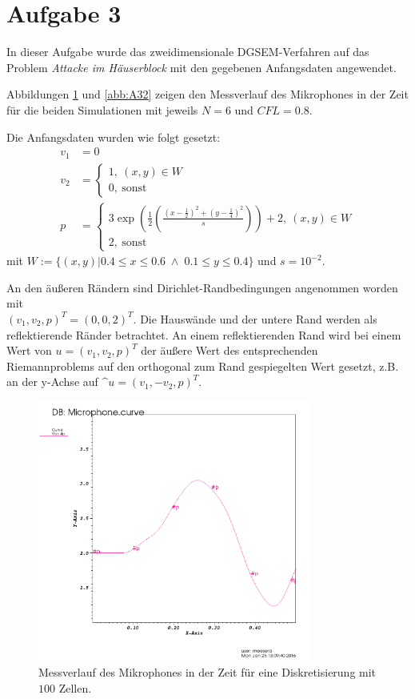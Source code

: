\section*{Aufgabe 3}
\label{sec:3}

In dieser Aufgabe wurde das zweidimensionale DGSEM-Verfahren auf das Problem
\textit{Attacke im Häuserblock} mit den gegebenen Anfangsdaten angewendet.

Abbildungen \ref{abb:A31} und \ref{abb:A32} zeigen den Messverlauf des
Mikrophones in der Zeit für die beiden Simulationen mit jeweils $N=6$ und
$CFL=0.8$.

Die Anfangsdaten wurden wie folgt gesetzt:
\begin{align}
v_1 &= 0\\
v_2 &= \begin{cases}
1, \ (x,y)\in W\\
0, \ \text{sonst}
\end{cases}\\
p &= \begin{cases}
3\exp (\frac{1}{2}(\frac{(x-\frac{1}{2})^2+(y-\frac{1}{4})^2}{s}))+2, \ (x,y)\in W\\
2, \ \text{sonst}
\end{cases}
\end{align}
mit $W:=\{(x,y) | 0.4\leq x\leq 0.6 \; \wedge \; 0.1\leq y\leq 0.4\}$ und $s=10^{-2}$.

An den äußeren Rändern sind Dirichlet-Randbedingungen angenommen worden mit \\
$(v_1,v_2,p)^T = (0,0,2)^T$. Die Hauswände und der untere Rand werden als
reflektierende Ränder betrachtet. An einem reflektierenden Rand wird bei einem
Wert von $u=(v_1,v_2,p)^T$ der äußere Wert des entsprechenden Riemannproblems
auf den orthogonal zum Rand gespiegelten Wert gesetzt, z.B. an der y-Achse auf
$\^{u}=(v_1,-v_2,p)^T$.

\begin{figure}[H]
	\begin{center}
		\includegraphics[width=0.8\textwidth]{img/Microphone_lowRes.png}
		\caption{Messverlauf des Mikrophones in der Zeit für eine Diskretisierung mit $100$ Zellen.}
		\label{abb:A31}
	\end{center}
\end{figure}

